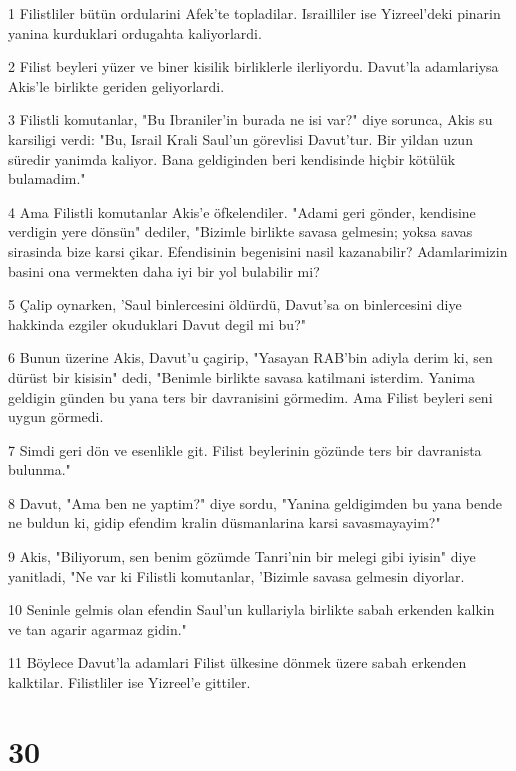 \par 1 Filistliler bütün ordularini Afek'te topladilar. Israilliler ise Yizreel'deki pinarin yanina kurduklari ordugahta kaliyorlardi.
\par 2 Filist beyleri yüzer ve biner kisilik birliklerle ilerliyordu. Davut'la adamlariysa Akis'le birlikte geriden geliyorlardi.
\par 3 Filistli komutanlar, "Bu Ibraniler'in burada ne isi var?" diye sorunca, Akis su karsiligi verdi: "Bu, Israil Krali Saul'un görevlisi Davut'tur. Bir yildan uzun süredir yanimda kaliyor. Bana geldiginden beri kendisinde hiçbir kötülük bulamadim."
\par 4 Ama Filistli komutanlar Akis'e öfkelendiler. "Adami geri gönder, kendisine verdigin yere dönsün" dediler, "Bizimle birlikte savasa gelmesin; yoksa savas sirasinda bize karsi çikar. Efendisinin begenisini nasil kazanabilir? Adamlarimizin basini ona vermekten daha iyi bir yol bulabilir mi?
\par 5 Çalip oynarken, 'Saul binlercesini öldürdü, Davut'sa on binlercesini diye hakkinda ezgiler okuduklari Davut degil mi bu?"
\par 6 Bunun üzerine Akis, Davut'u çagirip, "Yasayan RAB'bin adiyla derim ki, sen dürüst bir kisisin" dedi, "Benimle birlikte savasa katilmani isterdim. Yanima geldigin günden bu yana ters bir davranisini görmedim. Ama Filist beyleri seni uygun görmedi.
\par 7 Simdi geri dön ve esenlikle git. Filist beylerinin gözünde ters bir davranista bulunma."
\par 8 Davut, "Ama ben ne yaptim?" diye sordu, "Yanina geldigimden bu yana bende ne buldun ki, gidip efendim kralin düsmanlarina karsi savasmayayim?"
\par 9 Akis, "Biliyorum, sen benim gözümde Tanri'nin bir melegi gibi iyisin" diye yanitladi, "Ne var ki Filistli komutanlar, 'Bizimle savasa gelmesin diyorlar.
\par 10 Seninle gelmis olan efendin Saul'un kullariyla birlikte sabah erkenden kalkin ve tan agarir agarmaz gidin."
\par 11 Böylece Davut'la adamlari Filist ülkesine dönmek üzere sabah erkenden kalktilar. Filistliler ise Yizreel'e gittiler.

\chapter{30}

